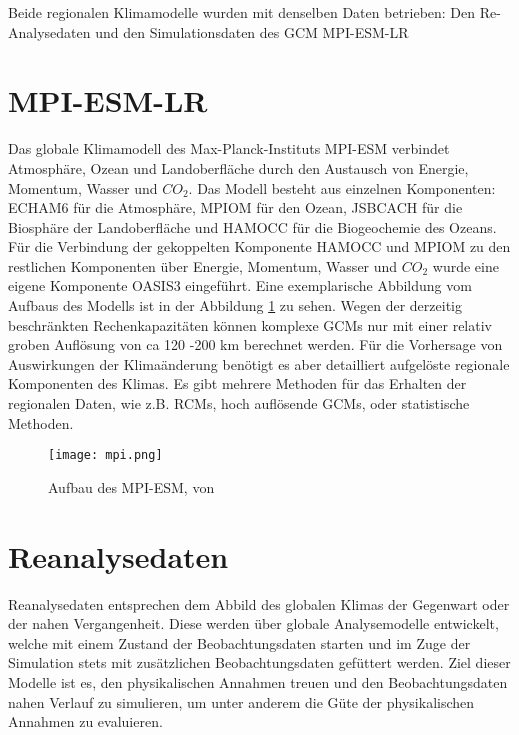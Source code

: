 Beide regionalen Klimamodelle wurden mit denselben Daten betrieben: Den Re-Analysedaten und den Simulationsdaten des GCM MPI-ESM-LR 
\section{MPI-ESM-LR} \label{sec:MPI}
Das globale Klimamodell des Max-Planck-Instituts MPI-ESM verbindet Atmosphäre, Ozean und Landoberfläche durch den Austausch von Energie, Momentum, Wasser und $CO_{2}$. Das Modell besteht aus einzelnen Komponenten: ECHAM6 für die Atmosphäre, MPIOM für den Ozean, JSBCACH für die Biosphäre der Landoberfläche und HAMOCC für die Biogeochemie des Ozeans. Für die Verbindung der gekoppelten Komponente HAMOCC und MPIOM zu den restlichen Komponenten über Energie, Momentum, Wasser und $CO_2$ wurde eine eigene Komponente OASIS3 eingeführt. Eine exemplarische Abbildung vom Aufbaus des Modells ist in der Abbildung \ref{fig:mpi-esm} zu sehen. Wegen der derzeitig beschränkten Rechenkapazitäten können komplexe GCMs nur mit einer relativ groben Auflösung von ca 120 -200 km berechnet werden. Für die Vorhersage von Auswirkungen der Klimaänderung benötigt es aber detailliert aufgelöste regionale Komponenten des Klimas. Es gibt mehrere Methoden für das Erhalten der regionalen Daten, wie z.B. RCMs, hoch auflösende GCMs, oder statistische Methoden.
\begin{figure}[h]
	\centering
	\texttt{[image: mpi.png]}
	\caption{Aufbau des MPI-ESM, von \cite{mpi-esm-lr}}
	\label{fig:mpi-esm}
\end{figure}
\section{Reanalysedaten}
Reanalysedaten entsprechen dem Abbild des globalen Klimas der Gegenwart oder der nahen Vergangenheit. Diese werden über globale Analysemodelle entwickelt, welche mit einem Zustand der Beobachtungsdaten starten und im Zuge der Simulation stets mit zusätzlichen Beobachtungsdaten gefüttert werden. Ziel dieser Modelle ist es, den physikalischen Annahmen treuen und den Beobachtungsdaten nahen Verlauf zu simulieren, um unter anderem die Güte der physikalischen Annahmen zu evaluieren.
